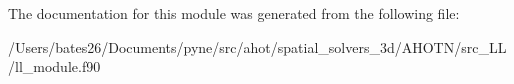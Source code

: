 The documentation for this module was generated from the following file\+:\begin{DoxyCompactItemize}
\item 
/\+Users/bates26/\+Documents/pyne/src/ahot/spatial\+\_\+solvers\+\_\+3d/\+A\+H\+O\+T\+N/src\+\_\+\+L\+L/ll\+\_\+module.\+f90\end{DoxyCompactItemize}
